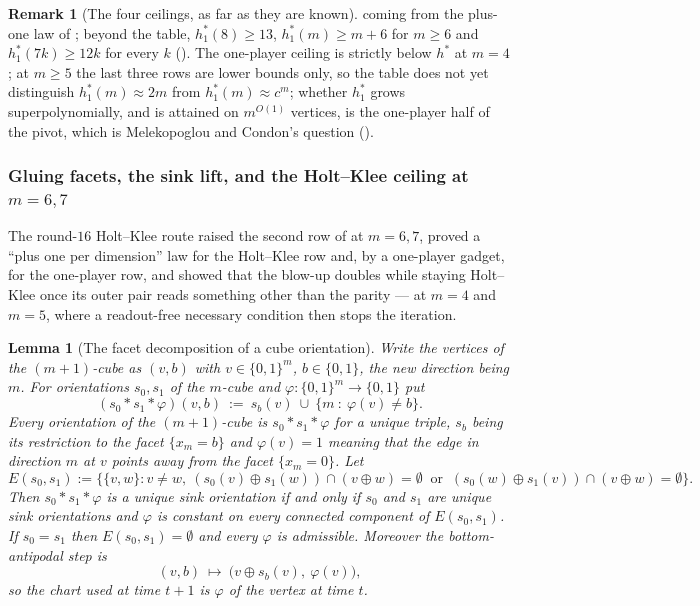 \documentclass[11pt]{article}
\theoremstyle{plain}
\newtheorem{lemma}[theorem]{Lemma}
\theoremstyle{definition}
\newtheorem{remark}[theorem]{Remark}
\begin{document}
\begin{remark}[The four ceilings, as far as they are known]
coming from the plus-one law of ; beyond
the table, $h^{\ast}_{1}(8)\ge13$, $h^{\ast}_{1}(m)\ge m+6$ for $m\ge6$
and $h^{\ast}_{1}(7k)\ge12k$ for every $k$
(). The one-player ceiling is strictly
below $h^{\ast}$ at $m=4$; at $m\ge5$ the last three rows are lower
bounds only, so the table does not yet distinguish
$h^{\ast}_{1}(m)\approx2m$ from $h^{\ast}_{1}(m)\approx c^{m}$; whether
$h^{\ast}_{1}$ grows superpolynomially, and is attained on $m^{O(1)}$
vertices, is the one-player half of the pivot, which is Melekopoglou and
Condon's question ().
\end{remark}

\subsubsection*{Gluing facets, the sink lift, and the Holt--Klee ceiling at $m=6,7$}

The round-$16$ Holt--Klee route raised the second row of
 at $m=6,7$, proved a ``plus one per dimension''
law for the Holt--Klee row and, by a one-player gadget, for the one-player
row, and showed that the blow-up doubles while
staying Holt--Klee once its outer pair reads something other than the
parity --- at $m=4$ and $m=5$, where a readout-free necessary condition
then stops the iteration.

\begin{lemma}[The facet decomposition of a cube orientation]\label{lem:facet-gluing}
Write the vertices of the $(m+1)$-cube as $(v,b)$ with $v\in\{0,1\}^{m}$,
$b\in\{0,1\}$, the new direction being $m$. For orientations $s_0,s_1$ of
the $m$-cube and $\varphi:\{0,1\}^{m}\to\{0,1\}$ put
\[
  (s_0\!*\!s_1\!*\!\varphi)(v,b)\ :=\ s_b(v)\ \cup\ \{m\ :\ \varphi(v)\ne b\}.
\]
Every orientation of the $(m+1)$-cube is $s_0\!*\!s_1\!*\!\varphi$ for a
unique triple, $s_b$ being its restriction to the facet $\{x_m=b\}$ and
$\varphi(v)=1$ meaning that the edge in direction $m$ at $v$ points away
from the facet $\{x_m=0\}$. Let
\[
 E(s_0,s_1):=\bigl\{\{v,w\}: v\ne w,\ (s_0(v)\oplus s_1(w))\cap(v\oplus w)=\emptyset
   \ \text{ or }\ (s_0(w)\oplus s_1(v))\cap(v\oplus w)=\emptyset\bigr\}.
\]
Then $s_0\!*\!s_1\!*\!\varphi$ is a unique sink orientation if and only if
$s_0$ and $s_1$ are unique sink orientations and $\varphi$ is constant on
every connected component of $E(s_0,s_1)$. If $s_0=s_1$ then
$E(s_0,s_1)=\emptyset$ and every $\varphi$ is admissible. Moreover the
bottom-antipodal step is
\[
  (v,b)\ \longmapsto\ \bigl(v\oplus s_b(v),\ \varphi(v)\bigr),
\]
so the chart used at time $t+1$ is $\varphi$ of the vertex at time $t$.
\end{lemma}
\end{document}
